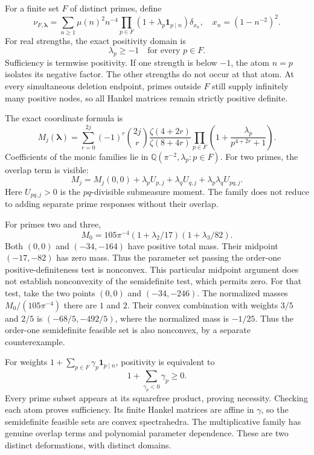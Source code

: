 For a finite set $F$ of distinct primes, define
\[
\nu_{F,\boldsymbol\lambda}
=\sum_{n\ge1}\mu(n)^2n^{-4}
\prod_{p\in F}(1+\lambda_p\mathbf1_{p\mid n})\delta_{x_n},
\quad x_n=(1-n^{-2})^2.
\]
For real strengths, the exact positivity domain is
\[
\boxed{\lambda_p\ge-1\quad\text{for every }p\in F.}
\]
Sufficiency is termwise positivity. If one strength is below $-1$, the
atom $n=p$ isolates its negative factor. The other strengths do not occur
at that atom. At every simultaneous deletion endpoint, primes outside
$F$ still supply infinitely many positive nodes, so all Hankel matrices
remain strictly positive definite.

The exact coordinate formula is
\[
M_j(\boldsymbol\lambda)=\sum_{r=0}^{2j}(-1)^r\binom{2j}{r}
\frac{\zeta(4+2r)}{\zeta(8+4r)}
\prod_{p\in F}\left(1+\frac{\lambda_p}{p^{4+2r}+1}\right).
\]
Coefficients of the monic families lie in
$\mathbb Q(\pi^{-2},\lambda_p:p\in F)$.
For two primes, the overlap term is visible:
\[
M_j=M_j(0,0)+\lambda_pU_{p,j}+\lambda_qU_{q,j}
+\lambda_p\lambda_qU_{pq,j}.
\]
Here $U_{pq,j}>0$ is the $pq$-divisible submeasure moment. The family
does not reduce to adding separate prime responses without their overlap.

For primes two and three,
\[
M_0=105\pi^{-4}(1+\lambda_2/17)(1+\lambda_3/82).
\]
Both $(0,0)$ and $(-34,-164)$ have positive total mass. Their midpoint
$(-17,-82)$ has zero mass. Thus the parameter set passing the order-one
positive-definiteness test is nonconvex. This particular midpoint argument
does not establish nonconvexity of the semidefinite test, which permits zero.
For that test, take the two points $(0,0)$ and $(-34,-246)$.
The normalized masses $M_0/(105\pi^{-4})$ there are $1$ and $2$.
Their convex combination with weights $3/5$ and $2/5$ is
$(-68/5,-492/5)$, where the normalized mass is $-1/25$.
Thus the order-one semidefinite feasible set is also nonconvex,
by a separate counterexample.

For weights $1+\sum_{p\in F}\gamma_p\mathbf1_{p\mid n}$, positivity is
equivalent to
\[
1+\sum_{\gamma_p<0}\gamma_p\ge0.
\]
Every prime subset appears at its squarefree product, proving necessity.
Checking each atom proves sufficiency. Its finite Hankel matrices are affine
in $\gamma$, so the semidefinite feasible sets are convex spectrahedra.
The multiplicative family has genuine overlap terms and polynomial parameter
dependence. These are two distinct deformations, with distinct domains.

